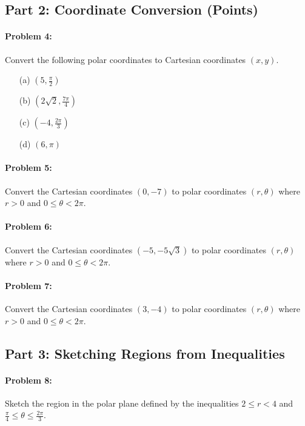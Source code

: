 \documentclass{article}
\begin{document}
\subsection*{Part 2: Coordinate Conversion (Points)}

\paragraph{Problem 4:} Convert the following polar coordinates to Cartesian coordinates $(x, y)$.
\begin{itemize}
    \item[(a)] $(5, \frac{\pi}{2})$
    \item[(b)] $(2\sqrt{2}, \frac{7\pi}{4})$
    \item[(c)] $(-4, \frac{2\pi}{3})$
    \item[(d)] $(6, \pi)$
\end{itemize}

\paragraph{Problem 5:} Convert the Cartesian coordinates $(0, -7)$ to polar coordinates $(r, \theta)$ where $r > 0$ and $0 \le \theta < 2\pi$.

\paragraph{Problem 6:} Convert the Cartesian coordinates $(-5, -5\sqrt{3})$ to polar coordinates $(r, \theta)$ where $r > 0$ and $0 \le \theta < 2\pi$.

\paragraph{Problem 7:} Convert the Cartesian coordinates $(3, -4)$ to polar coordinates $(r, \theta)$ where $r > 0$ and $0 \le \theta < 2\pi$.

\subsection*{Part 3: Sketching Regions from Inequalities}

\paragraph{Problem 8:} Sketch the region in the polar plane defined by the inequalities $2 \le r < 4$ and $\frac{\pi}{4} \le \theta \le \frac{2\pi}{3}$.
\end{document}
